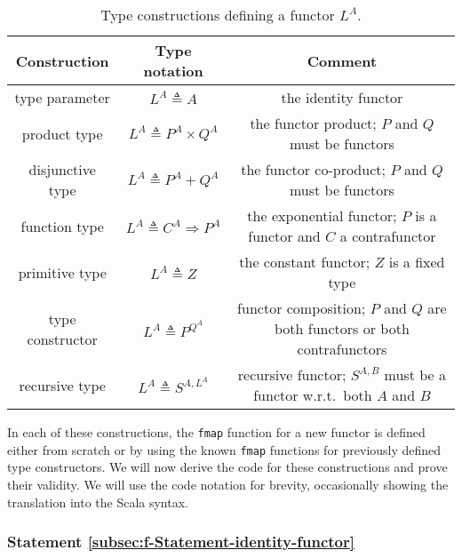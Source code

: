 \begin{table}
\begin{centering}
\begin{tabular}{|c|c|c|}
\hline 
\textbf{\small{}Construction} & \textbf{\small{}Type notation} & \textbf{\small{}Comment}\tabularnewline
\hline 
\hline 
{\footnotesize{}type parameter} & {\footnotesize{}$L^{A}\triangleq A$} & {\footnotesize{}the identity functor}\tabularnewline
\hline 
{\footnotesize{}product type} & {\footnotesize{}$L^{A}\triangleq P^{A}\times Q^{A}$} & {\footnotesize{}the functor product; $P$ and $Q$ must be functors}\tabularnewline
\hline 
{\footnotesize{}disjunctive type} & {\footnotesize{}$L^{A}\triangleq P^{A}+Q^{A}$} & {\footnotesize{}the functor co-product; $P$ and $Q$ must be functors}\tabularnewline
\hline 
{\footnotesize{}function type} & {\footnotesize{}$L^{A}\triangleq C^{A}\Rightarrow P^{A}$} & {\footnotesize{}the exponential functor; $P$ is a functor and $C$
a contrafunctor}\tabularnewline
\hline 
{\footnotesize{}primitive type} & {\footnotesize{}$L^{A}\triangleq Z$} & {\footnotesize{}the constant functor; $Z$ is a fixed type}\tabularnewline
\hline 
{\footnotesize{}type constructor} & {\footnotesize{}$L^{A}\triangleq P^{Q^{A}}$} & {\footnotesize{}functor composition; $P$ and $Q$ are both functors
or both contrafunctors}\tabularnewline
\hline 
{\footnotesize{}recursive type} & {\footnotesize{}$L^{A}\triangleq S^{A,L^{A}}$} & {\footnotesize{}recursive functor; $S^{A,B}$ must be a functor w.r.t.~both
$A$ and $B$}\tabularnewline
\hline 
\end{tabular}
\par\end{centering}
\caption{Type constructions defining a functor $L^{A}$.\label{tab:f-Functor-constructions}}
\end{table}

In each of these constructions, the \lstinline!fmap! function for
a new functor is defined either from scratch or by using the known
\lstinline!fmap! functions for previously defined type constructors.
We will now derive the code for these constructions and prove their
validity. We will use the code notation for brevity, occasionally
showing the translation into the Scala syntax.

\subsubsection{Statement \label{subsec:f-Statement-identity-functor}\ref{subsec:f-Statement-identity-functor}}

